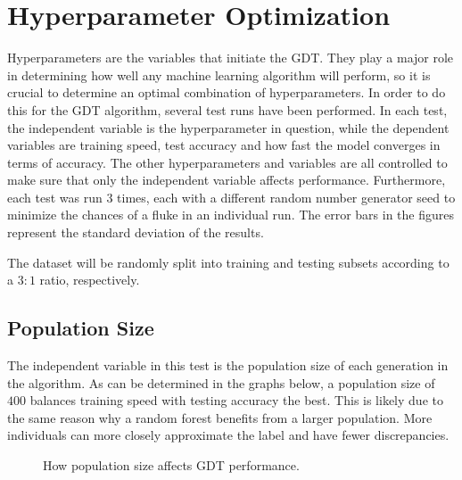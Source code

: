 \documentclass[12pt]{article}
\begin{document}
\section{Hyperparameter Optimization}

Hyperparameters are the variables that initiate the GDT. They play a major role in determining how well any machine learning algorithm will perform, so it is crucial to determine an optimal combination of hyperparameters. In order to do this for the GDT algorithm, several test runs have been performed. In each test, the independent variable is the hyperparameter in question, while the dependent variables are training speed, test accuracy and how fast the model converges in terms of accuracy. The other hyperparameters and variables are all controlled to make sure that only the independent variable affects performance. Furthermore, each test was run $3$ times, each with a different random number generator seed to minimize the chances of a fluke in an individual run. The error bars in the figures represent the standard deviation of the results.

The dataset will be randomly split into training and testing subsets according to a $3:1$ ratio, respectively.

\subsection{Population Size}

The independent variable in this test is the population size of each generation in the algorithm. As can be determined in the graphs below, a population size of $400$ balances training speed with testing accuracy the best. This is likely due to the same reason why a random forest benefits from a larger population. More individuals can more closely approximate the label and have fewer discrepancies.

\begin{figure}[H]
    \centering
    \caption{How population size affects GDT performance.}
\end{figure}
\end{document}
